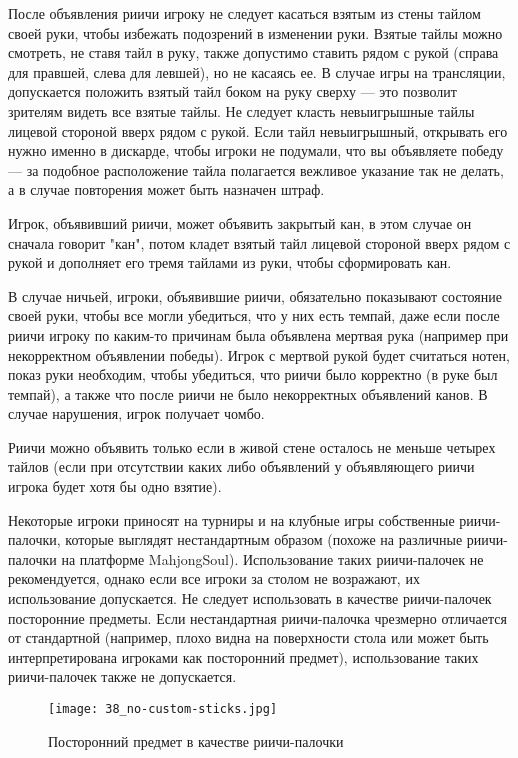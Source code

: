 После объявления риичи игроку не следует касаться взятым из стены тайлом своей руки, чтобы избежать подозрений в изменении руки. Взятые тайлы можно смотреть, не ставя тайл в руку, также допустимо ставить рядом с рукой (справа для правшей, слева для левшей), но не касаясь ее. В случае игры на трансляции, допускается положить взятый тайл боком на руку сверху --- это позволит зрителям видеть все взятые тайлы. Не следует класть невыигрышные тайлы лицевой стороной вверх рядом с рукой. Если тайл невыигрышный, открывать его нужно именно в дискарде, чтобы игроки не подумали, что вы объявляете победу --- за подобное расположение тайла полагается вежливое указание так не делать, а в случае повторения может быть назначен штраф.

Игрок, объявивший риичи, может объявить закрытый кан, в этом случае он сначала говорит "кан", потом кладет взятый тайл лицевой стороной вверх рядом с рукой и дополняет его тремя тайлами из руки, чтобы сформировать кан.

В случае ничьей, игроки, объявившие риичи, обязательно показывают состояние своей руки, чтобы все могли убедиться, что у них есть темпай, даже если после риичи игроку по каким-то причинам была объявлена мертвая рука (например при некорректном объявлении победы). Игрок с мертвой рукой будет считаться нотен, показ руки необходим, чтобы убедиться, что риичи было корректно (в руке был темпай), а также что после риичи не было некорректных объявлений канов. В случае нарушения, игрок получает чомбо.

Риичи можно объявить только если в живой стене осталось не меньше четырех тайлов (если при отсутствии каких либо объявлений у объявляющего риичи игрока будет хотя бы одно взятие). 

\newpage

Некоторые игроки приносят на турниры и на клубные игры собственные риичи-палочки, которые выглядят нестандартным образом (похоже на различные риичи-палочки на платформе MahjongSoul). Использование таких риичи-палочек не рекомендуется, однако если все игроки за столом не возражают, их использование допускается. Не следует использовать в качестве риичи-палочек посторонние предметы. Если нестандартная риичи-палочка чрезмерно отличается от стандартной (например, плохо видна на поверхности стола или может быть интерпретирована игроками как посторонний предмет), использование таких риичи-палочек также не допускается.

\begin{figure}[H]
	\centering
	\texttt{[image: 38\_no-custom-sticks.jpg]}
	\caption{Посторонний предмет в качестве риичи-палочки}
\end{figure}

